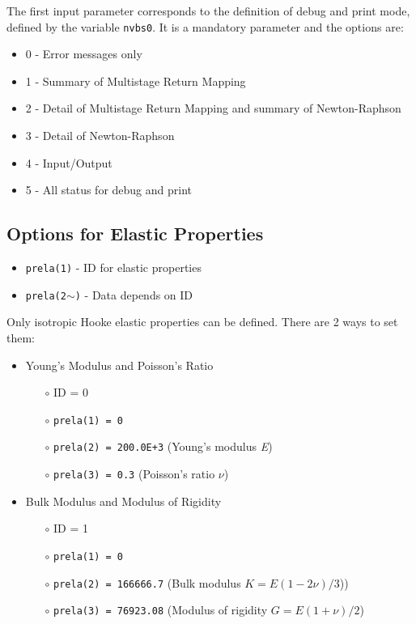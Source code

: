 \documentclass[11pt,a4paper,twoside,final,onecolumn,titlepage]{article}
\begin{document}
The first input parameter corresponds to the definition of debug and print mode, defined by the variable \texttt{nvbs0}. It is a mandatory parameter and the options are:

\begin{itemize}
	\item 0 - Error messages only
	\item 1 - Summary of Multistage Return Mapping
	\item 2 - Detail of Multistage Return Mapping and summary of Newton-Raphson
	\item 3 - Detail of Newton-Raphson
	\item 4 - Input/Output
	\item 5 - All status for debug and print
\end{itemize}

\subsection{Options for Elastic Properties}

\begin{itemize}
	\item \texttt{prela(1)} - ID for elastic properties
	\item \texttt{prela(2$\mathtt{\sim}$)} - Data depends on ID
\end{itemize}

\noindent Only isotropic Hooke elastic properties can be defined. There are 2 ways to set them: 

\begin{itemize}
	\item Young's Modulus and Poisson’s Ratio
	\begin{itemize}
		\item[$\circ$] ID = 0
		\item[$\circ$] \texttt{prela(1) = 0}
		\item[$\circ$] \texttt{prela(2) = 200.0E+3} (Young’s modulus \textit{E})
		\item[$\circ$] \texttt{prela(3) = 0.3} (Poisson's ratio $\nu$)
	\end{itemize}
\end{itemize}

\begin{itemize}
	\item Bulk Modulus and Modulus of Rigidity
	\begin{itemize}
		\item[$\circ$] ID = 1
		\item[$\circ$] \texttt{prela(1) = 0}
		\item[$\circ$] \texttt{prela(2) = 166666.7} (Bulk modulus $K=E(1-2\nu)/3$))
		\item[$\circ$] \texttt{prela(3) = 76923.08} (Modulus of rigidity $G=E(1+\nu)/2$)
	\end{itemize}
\end{itemize}
\end{document}
